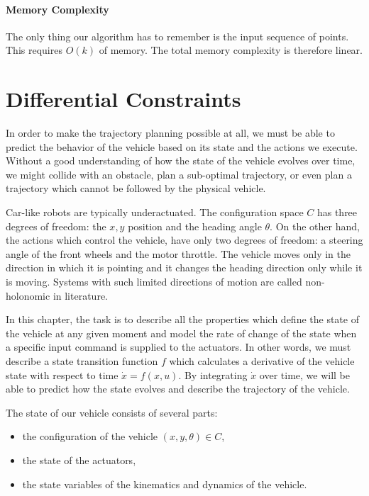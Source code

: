 \paragraph{Memory Complexity}
The only thing our algorithm has to remember is the input sequence of points. This requires $O(k)$ of memory. The total memory complexity is therefore linear.

\section{Differential Constraints}
\label{sec:vehicle_model}

In order to make the trajectory planning possible at all, we must be able to predict the behavior of the vehicle based on its state and the actions we execute. Without a good understanding of how the state of the vehicle evolves over time, we might collide with an obstacle, plan a sub-optimal trajectory, or even plan a trajectory which cannot be followed by the physical vehicle.

Car-like robots are typically underactuated. The configuration space $C$ has three degrees of freedom: the $x, y$ position and the heading angle $\theta$. On the other hand, the actions which control the vehicle, have only two degrees of freedom: a steering angle of the front wheels and the motor throttle. The vehicle moves only in the direction in which it is pointing and it changes the heading direction only while it is moving. Systems with such limited directions of motion are called non-holonomic in literature.

In this chapter, the task is to describe all the properties which define the state of the vehicle at any given moment and model the rate of change of the state when a specific input command is supplied to the actuators. In other words, we must describe a state transition function $f$ which calculates a derivative of the vehicle state with respect to time $\dot{x}=f(x, u)$. By integrating $\dot{x}$ over time, we will be able to predict how the state evolves and describe the trajectory of the vehicle.

The state of our vehicle consists of several parts:
\begin{itemize}
	\item the configuration of the vehicle $(x, y, \theta)\in C$,
	\item the state of the actuators,
	\item the state variables of the kinematics and dynamics of the vehicle.
\end{itemize}

